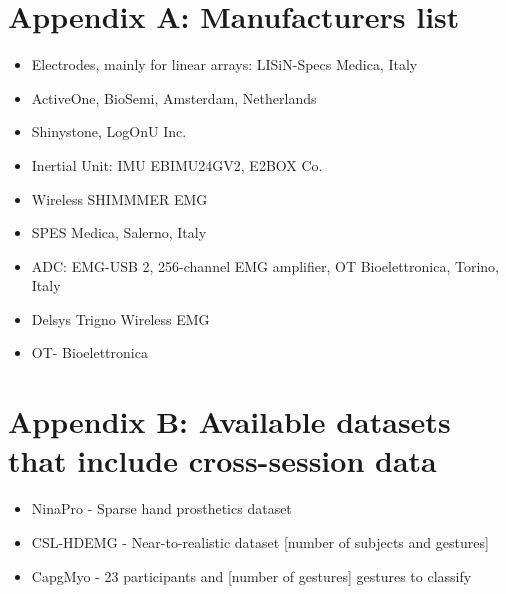 \documentclass{article}
\begin{document}
\section{Appendix A: Manufacturers list}
\begin{itemize}
\item Electrodes, mainly for linear arrays: LISiN-Specs Medica, Italy \cite{Kilby2016}
\item ActiveOne, BioSemi, Amsterdam, Netherlands \citep{Kilby2016}
\item Shinystone, LogOnU Inc. \cite{Kim2016}
\item Inertial Unit: IMU EBIMU24GV2, E2BOX Co. \cite{Kim2016}
\item Wireless SHIMMMER EMG \cite{Sulaiman2016}
\item SPES Medica, Salerno, Italy \cite{Martinez-Valdes2016}
\item ADC: EMG-USB 2, 256-channel EMG amplifier, OT Bioelettronica, Torino, Italy \cite{Martinez-Valdes2016}
\item Delsys Trigno Wireless EMG \cite{El-Khoury2015}
\item OT- Bioelettronica \cite{Amma2015}
\end{itemize}


\section{Appendix B: Available datasets that include cross-session data}
\begin{itemize}
\item NinaPro - Sparse hand prosthetics dataset \cite{Du2017}
\item CSL-HDEMG - Near-to-realistic dataset [number of subjects and gestures] \cite{Amma2015}
\item CapgMyo - 23 participants and [number of gestures] gestures to classify \cite{Du2017}
\end{itemize}





\end{document}
